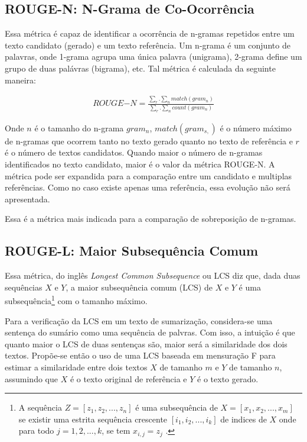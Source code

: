 \subsection{ROUGE-N: N-Grama de Co-Ocorrência}
Essa métrica é capaz de identificar a ocorrência de n-gramas repetidos entre um texto candidato (gerado) e um texto referência. Um n-grama é um conjunto de palavras, onde 1-grama agrupa uma única palavra (unigrama), 2-grama define um grupo de duas palávras (bigrama), etc. Tal métrica é calculada da seguinte maneira:

\begin{gather}
  ROUGE{-N} = \frac{\sum_{r} . \sum_{n} match(gram_{n})}
  {\sum_{r} . \sum_{n} count(gram_{n})}
\end{gather}

Onde $n$ é o tamanho do n-grama $gram_n$, $match(gram_{s,})$ é o número máximo de n-gramas que ocorrem tanto no texto gerado quanto no texto de referência e $r$ é o número de textos candidatos. Quando maior o número de n-gramas identificados no texto candidato, maior é o valor da métrica ROUGE-N. A métrica pode ser expandida para a comparação entre um candidato e multiplas referências. Como no caso existe apenas uma referência, essa evolução não será apresentada.

Essa é a métrica mais indicada para a comparação de sobreposição de n-gramas.

\subsection{ROUGE-L: Maior Subsequência Comum}

Essa métrica, do inglês \textit{Longest Common Subsequence} ou LCS diz que, dada duas sequências $X$ e $Y$, a maior subsequência comum (LCS) de $X$ e $Y$ é uma subsequência\footnote{
  A sequência \(Z = [z_1, z_2, ..., z_n]\) é uma
  subsequência de \(X = [x_1, x_2, ..., x_m]\) se existir uma estrita sequência crescente \([i_1, i_2, ..., i_k]\) de indices de $X$ onde para todo \(j = 1, 2, ..., k\), se tem \(x_{i,j} =  z_j\) \cite{intro-to-algorithms}.
} com o tamanho máximo.

Para a verificação da LCS em um texto de sumarização, considera-se uma sentença do sumário como uma sequência de palvras. Com isso, a intuição é que quanto maior o LCS de duas sentenças são, maior será a similaridade dos dois textos. Propõe-se então o uso de uma LCS baseada em mensuração F para estimar a similaridade entre dois textos $X$ de tamanho $m$ e $Y$ de tamanho $n$, assumindo que $X$ é o texto original de referência e $Y$ é o texto gerado.

